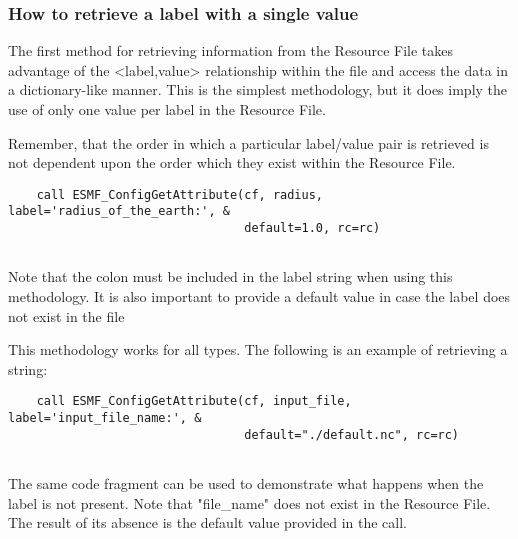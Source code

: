 
  \subsubsection{How to retrieve a label with a single value}
   The first method for retrieving information from the 
   Resource File takes advantage of the <label,value> relationship
   within the file and access the data in a dictionary-like manner. This is the
   simplest methodology, but it does imply the use of only one value per label
   in the Resource File.  
   
   Remember,
   that the order in which a particular label/value pair is retrieved
   is not dependent upon the order which they exist within the Resource File.  

 \begin{verbatim}
    call ESMF_ConfigGetAttribute(cf, radius, label='radius_of_the_earth:', &
                                 default=1.0, rc=rc)
 
\end{verbatim}
 

   Note that the colon must be included in the label string when using this
   methodology.  It is also important to provide a default value in case the label
   does not exist in the file 

   This methodology works for all types. The following is an example of retrieving a 
   string: 

 \begin{verbatim}
    call ESMF_ConfigGetAttribute(cf, input_file, label='input_file_name:', &
                                 default="./default.nc", rc=rc)
 
\end{verbatim}
 

   The same code fragment can be used to demonstrate what happens when the label is not 
   present.  Note that "file\_name" does not exist in the Resource File. The result of 
   its absence is the default value provided in the call. 

